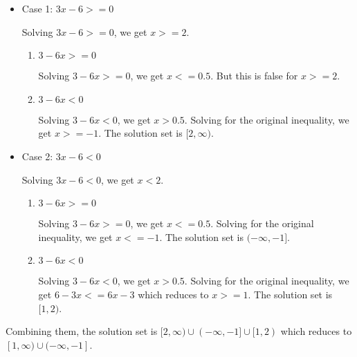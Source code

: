 \documentclass{article}
\begin{document}
\begin{itemize}
\item Case 1: $3x - 6 >= 0$

  Solving $3x - 6 >= 0$, we get $x >= 2$.
  
  \begin{enumerate}
  \item $3 - 6x >= 0$

    Solving $3 - 6x >= 0$, we get $x <= 0.5$. But this is false for
    $x >= 2$.
    
  \item $3 - 6x < 0$

    Solving $3 - 6x < 0$, we get $x > 0.5$. Solving for the original
    inequality, we get $x >= -1$. The solution set is $[2, \infty)$.
  \end{enumerate}

\item Case 2: $3x - 6 < 0$

  Solving $3x - 6 < 0$, we get $x < 2$.

  \begin{enumerate}
  \item $3 - 6x >= 0$

    Solving $3 - 6x >= 0$, we get $x <= 0.5$. Solving for the original
    inequality, we get $x <= -1$. The solution set is $(-\infty, -1]$.
    
  \item $3 - 6x < 0$

    Solving $3 - 6x < 0$, we get $x > 0.5$. Solving for the original
    inequality, we get $6 -3x <= 6x - 3$ which reduces to $x >= 1$.
    The solution set is $[1, 2)$.
  \end{enumerate}

\end{itemize}

Combining them, the solution set is
$[2, \infty) \cup (-\infty, -1] \cup [1, 2)$ which reduces to
$[1, \infty) \cup (-\infty, -1]$.
\end{document}

